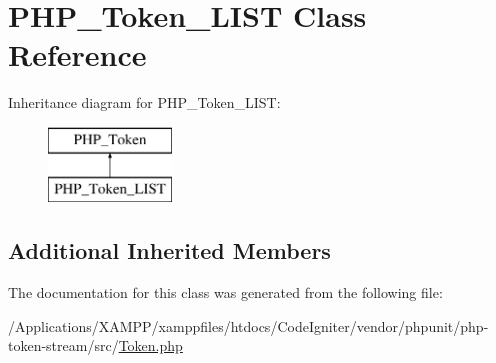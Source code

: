 \hypertarget{class_p_h_p___token___l_i_s_t}{}\section{P\+H\+P\+\_\+\+Token\+\_\+\+L\+I\+ST Class Reference}
\label{class_p_h_p___token___l_i_s_t}
Inheritance diagram for P\+H\+P\+\_\+\+Token\+\_\+\+L\+I\+ST\+:\begin{figure}[H]
\begin{center}
\leavevmode
\includegraphics[height=2.000000cm]{class_p_h_p___token___l_i_s_t}
\end{center}
\end{figure}
\subsection*{Additional Inherited Members}


The documentation for this class was generated from the following file\+:\begin{DoxyCompactItemize}
\item 
/\+Applications/\+X\+A\+M\+P\+P/xamppfiles/htdocs/\+Code\+Igniter/vendor/phpunit/php-\/token-\/stream/src/\mbox{\hyperlink{_token_8php}{Token.\+php}}\end{DoxyCompactItemize}
